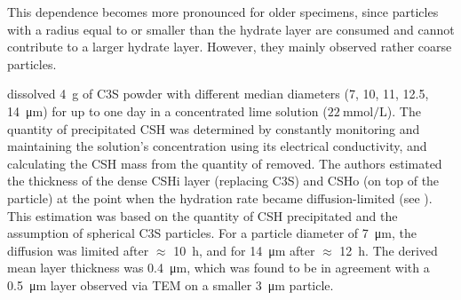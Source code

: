 This dependence becomes more pronounced for older specimens, since particles with a radius equal to or smaller than the hydrate layer are consumed and cannot contribute to a larger hydrate layer.
However, they mainly observed rather coarse particles.

\textcite{garrault.2006} dissolved \qty{4}{\gram} of \ac{C3S} powder with different median diameters (7, 10, 11, 12.5, \qty{14}{\micro\meter}) for up to one day in a concentrated lime solution ($\qty{22}{\milli\mole\per\liter}$).
The quantity of precipitated \ac{CSH} was determined by constantly monitoring and maintaining the solution's  concentration using its electrical conductivity, and calculating the \ac{CSH} mass from the quantity of  removed.
The authors estimated the thickness of the dense \ac{CSHi} layer (replacing \ac{C3S}) and \ac{CSHo} (on top of the particle) at the point when the hydration rate became diffusion-limited (see ).
This estimation was based on the quantity of \ac{CSH} precipitated and the assumption of spherical \ac{C3S} particles.
For a particle diameter of \qty{7}{\micro\meter}, the diffusion was limited after $\approx$ \qty{10}{\hour}, and for \qty{14}{\micro\meter} after $\approx$ \qty{12}{\hour}.
The derived mean layer thickness was \qty{0.4}{\micro\meter}, which was found to be in agreement with a \qty{0.5}{\micro\meter} layer observed via \ac{TEM} on a smaller \qty{3}{\micro\meter} particle. %

